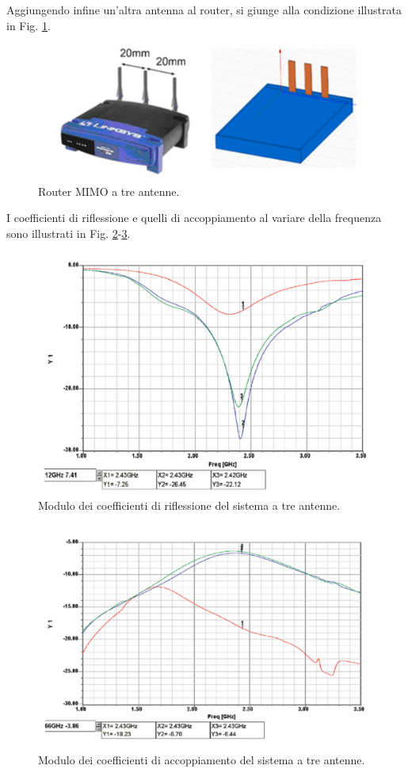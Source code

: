 \documentclass[technote]{IEEEtran}
\begin{document}
\par Aggiungendo infine un'altra antenna al router, si giunge alla condizione illustrata in Fig. \ref{fig:40}.
\begin{figure}[!ht]
\centering
\includegraphics[width=.9\columnwidth]{figure40}
\caption{Router MIMO a tre antenne.}
\label{fig:40}
\end{figure} 
I coefficienti di riflessione e quelli di accoppiamento al variare della frequenza sono illustrati in Fig. \ref{fig:35}-\ref{fig:36}.
\begin{figure}[!ht]
\centering
\includegraphics[width=.8\columnwidth]{figure35}
\caption{Modulo dei coefficienti di riflessione del sistema a tre antenne.}
\label{fig:35}
\end{figure}
\begin{figure}[!ht]
\centering
\includegraphics[width=.8\columnwidth]{figure36}
\caption{Modulo dei coefficienti di accoppiamento del sistema a tre antenne.}
\label{fig:36}
\end{figure}
\end{document}
